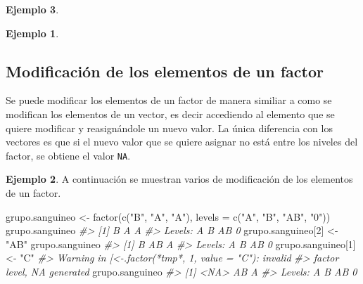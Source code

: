 \documentclass[
]{book}
\newenvironment{Shaded}{\begin{snugshade}}{\end{snugshade}}
\newcommand{\AttributeTok}[1]{\textcolor[rgb]{0.77,0.63,0.00}{#1}}
\newcommand{\CommentTok}[1]{\textcolor[rgb]{0.56,0.35,0.01}{\textit{#1}}}
\newcommand{\DecValTok}[1]{\textcolor[rgb]{0.00,0.00,0.81}{#1}}
\newcommand{\FunctionTok}[1]{\textcolor[rgb]{0.00,0.00,0.00}{#1}}
\newcommand{\NormalTok}[1]{#1}
\newcommand{\OtherTok}[1]{\textcolor[rgb]{0.56,0.35,0.01}{#1}}
\newcommand{\StringTok}[1]{\textcolor[rgb]{0.31,0.60,0.02}{#1}}
\theoremstyle{definition}
\theoremstyle{definition}
\newtheorem{example}{Ejemplo}[chapter]
\theoremstyle{definition}
\theoremstyle{definition}
\theoremstyle{remark}
\begin{document}
\begin{example}
\begin{example}
\end{example}

\hypertarget{modificaciuxf3n-de-los-elementos-de-un-factor}{%
\subsection{Modificación de los elementos de un factor}\label{modificaciuxf3n-de-los-elementos-de-un-factor}}

Se puede modificar los elementos de un factor de manera similiar a como se modifican los elementos de un vector, es decir accediendo al elemento que se quiere modificar y reasignándole un nuevo valor. La única diferencia con los vectores es que si el nuevo valor que se quiere asignar no está entre los niveles del factor, se obtiene el valor \texttt{NA}.

\begin{example}

A continuación se muestran varios de modificación de los elementos de un factor.

\begin{Shaded}
\begin{Highlighting}[]
\NormalTok{grupo.sanguineo }\OtherTok{\textless{}{-}} \FunctionTok{factor}\NormalTok{(}\FunctionTok{c}\NormalTok{(}\StringTok{"B"}\NormalTok{, }\StringTok{"A"}\NormalTok{, }\StringTok{"A"}\NormalTok{), }\AttributeTok{levels =} \FunctionTok{c}\NormalTok{(}\StringTok{"A"}\NormalTok{, }\StringTok{"B"}\NormalTok{, }\StringTok{"AB"}\NormalTok{, }\StringTok{"0"}\NormalTok{))}
\NormalTok{grupo.sanguineo}
\CommentTok{\#\textgreater{} [1] B A A}
\CommentTok{\#\textgreater{} Levels: A B AB 0}
\NormalTok{grupo.sanguineo[}\DecValTok{2}\NormalTok{] }\OtherTok{\textless{}{-}} \StringTok{"AB"}
\NormalTok{grupo.sanguineo}
\CommentTok{\#\textgreater{} [1] B  AB A }
\CommentTok{\#\textgreater{} Levels: A B AB 0}
\NormalTok{grupo.sanguineo[}\DecValTok{1}\NormalTok{] }\OtherTok{\textless{}{-}} \StringTok{"C"}
\CommentTok{\#\textgreater{} Warning in \textasciigrave{}[\textless{}{-}.factor\textasciigrave{}(\textasciigrave{}*tmp*\textasciigrave{}, 1, value = "C"): invalid}
\CommentTok{\#\textgreater{} factor level, NA generated}
\NormalTok{grupo.sanguineo}
\CommentTok{\#\textgreater{} [1] \textless{}NA\textgreater{} AB   A   }
\CommentTok{\#\textgreater{} Levels: A B AB 0}
\end{Highlighting}
\end{Shaded}

\end{example}


\end{example}
\end{document}
